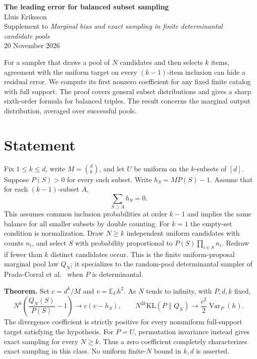 \documentclass[11pt]{article}
\newcommand{\EE}{\mathbb E}\newcommand{\Var}{\operatorname{Var}}
\begin{document}
\begin{center}{\LARGE\bfseries The leading error for balanced subset sampling}\\[7pt]
Lluis Eriksson\\[2pt]\small Supplement to \emph{Marginal bias and exact sampling in finite determinantal candidate pools}\\20 November 2026\end{center}
For a sampler that draws a pool of $N$ candidates and then selects $k$ items, agreement with the uniform target on every $(k-1)$-item inclusion can hide a residual error. We compute its first nonzero coefficient for any fixed finite catalog with full support. The proof covers general subset distributions and gives a sharp sixth-order formula for balanced triples. The result concerns the marginal output distribution, averaged over successful pools.

\section{Statement}
Fix $1\leq k\leq d$, write $M=\binom dk$, and let $U$ be uniform on the $k$-subsets of $[d]$. Suppose $P(S)>0$ for every such subset. Write $h_S=MP(S)-1$. Assume that for each $(k-1)$-subset $A$,
\[
                 \sum_{S\supset A} h_S=0.
\]
This assumes common inclusion probabilities at order $k-1$ and implies the same balance for all smaller subsets by double counting. For $k=1$ the empty-set condition is normalization. Draw $N\ge k$ independent uniform candidates with counts $n_i$, and select $S$ with probability proportional to $P(S)\prod_{i\in S}n_i$. Redraw if fewer than $k$ distinct candidates occur. This is the finite uniform-proposal marginal pool law $Q_N$; it specializes to the random-pool determinantal sampler of Prada-Corral et al.\ \cite{pool} when $P$ is determinantal.

\textbf{Theorem.} Set $c=d^k/M$ and $v=\EE_U h^2$. As $N$ tends to infinity, with $P,d,k$ fixed,
\[
 N^k\left(\frac{Q_N(S)}{P(S)}-1\right)\longrightarrow c(v-h_S),
 \qquad N^{2k}\mathrm{KL}(P\|Q_N)\longrightarrow
             \frac{c^2}{2}\Var_P(h).
\]
The divergence coefficient is strictly positive for every nonuniform full-support target satisfying the hypothesis. For $P=U$, permutation invariance instead gives exact sampling for every $N\ge k$. Thus a zero coefficient completely characterizes exact sampling in this class. No uniform finite-$N$ bound in $k,d$ is asserted.

\newpage
\end{document}
